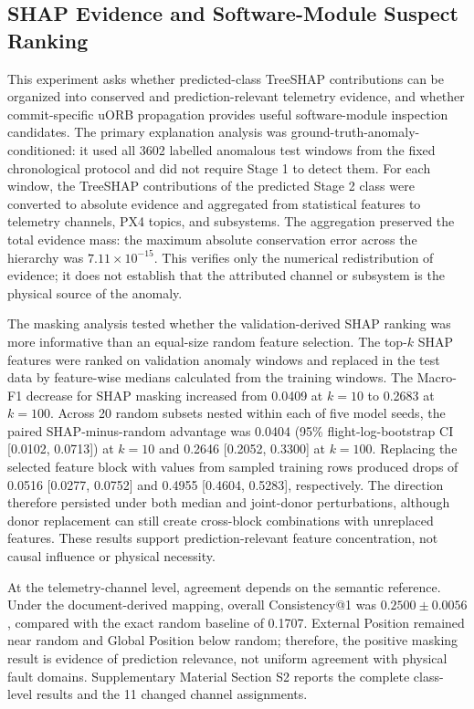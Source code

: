 \subsection{SHAP Evidence and Software-Module Suspect Ranking}
\label{sec:shap_module_results}

This experiment asks whether predicted-class TreeSHAP contributions can be organized into conserved and prediction-relevant telemetry evidence, and whether commit-specific uORB propagation provides useful software-module inspection candidates. The primary explanation analysis was ground-truth-anomaly-conditioned: it used all 3602 labelled anomalous test windows from the fixed chronological protocol and did not require Stage 1 to detect them. For each window, the TreeSHAP contributions of the predicted Stage 2 class were converted to absolute evidence and aggregated from statistical features to telemetry channels, PX4 topics, and subsystems. The aggregation preserved the total evidence mass: the maximum absolute conservation error across the hierarchy was $7.11 \times 10^{-15}$. This verifies only the numerical redistribution of evidence; it does not establish that the attributed channel or subsystem is the physical source of the anomaly.

The masking analysis tested whether the validation-derived SHAP ranking was more informative than an equal-size random feature selection. The top-$k$ SHAP features were ranked on validation anomaly windows and replaced in the test data by feature-wise medians calculated from the training windows. The Macro-F1 decrease for SHAP masking increased from 0.0409 at $k=10$ to 0.2683 at $k=100$. Across 20 random subsets nested within each of five model seeds, the paired SHAP-minus-random advantage was 0.0404 (95\% flight-log-bootstrap CI [0.0102, 0.0713]) at $k=10$ and 0.2646 [0.2052, 0.3300] at $k=100$. Replacing the selected feature block with values from sampled training rows produced drops of 0.0516 [0.0277, 0.0752] and 0.4955 [0.4604, 0.5283], respectively. The direction therefore persisted under both median and joint-donor perturbations, although donor replacement can still create cross-block combinations with unreplaced features. These results support prediction-relevant feature concentration, not causal influence or physical necessity.

At the telemetry-channel level, agreement depends on the semantic reference. Under the document-derived mapping, overall Consistency@1 was $0.2500\pm0.0056$, compared with the exact random baseline of 0.1707. External Position remained near random and Global Position below random; therefore, the positive masking result is evidence of prediction relevance, not uniform agreement with physical fault domains. Supplementary Material Section S2 reports the complete class-level results and the 11 changed channel assignments.

